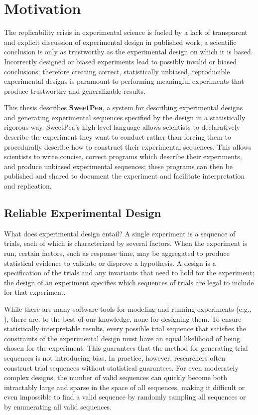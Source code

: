 
\chapter{Motivation}


The replicability crisis in experimental science is fueled by a lack of transparent and explicit discussion of experimental design in published work; a scientific conclusion is only as trustworthy as the experimental design on which it is based. Incorrectly designed or biased experiments lead to possibly invalid or biased conclusions; therefore creating correct, statistically unbiased, reproducible experimental designs is paramount to performing meaningful experiments that produce trustworthy and generalizable results.

This thesis describes \textbf{SweetPea}, a system for describing experimental designs and generating experimental sequences specified by the design in a statistically rigorous way. SweetPea's high-level language allows scientists to declaratively describe the experiment they want to conduct rather than forcing them to procedurally describe how to construct their experimental sequences. This allows scientists to write concise, correct programs which describe their experiments, and produce unbiased experimental sequences; these programs can then be published and shared to document the experiment and facilitate interpretation and replication.

\section{Reliable Experimental Design}

What does experimental design entail? A single experiment is a sequence of trials, each of which is characterized by several factors. When the experiment is run, certain factors, such as response time, may be aggregated to produce statistical evidence to validate or disprove a hypothesis. A design is a specification of the trials and any invariants that need to hold for the experiment; the design of an experiment specifies which sequences of trials are legal to include for that experiment.

While there are many software tools for modeling and running experiments (e.g., \cite{cohen1993psyscope} \cite{mathot2012opensesame} \cite{peirce2009generating}), there are, to the best of our knowledge, none for designing them. To ensure statistically interpretable results, every possible trial sequence that satisfies the constraints of the experimental design must have an equal likelihood of being chosen for the experiment. This guarantees that the method for generating trial sequences is not introducing bias. In practice, however, researchers often construct trial sequences without statistical guarantees. For even moderately complex designs, the number of valid sequences can quickly become both intractably large and sparse in the space of all sequences, making it difficult or even impossible to find a valid sequence by randomly sampling all sequences or by enumerating all valid sequences.

